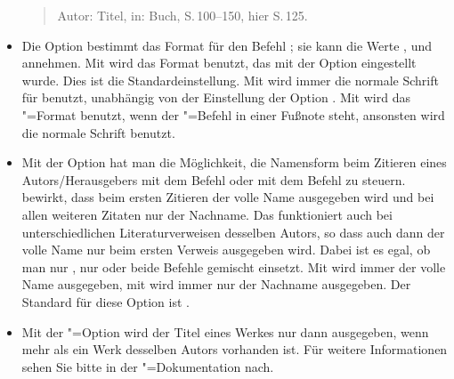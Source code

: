 \documentclass[ngerman]{scrartcl}
\begin{document}
\begin{itemize}
\begin{quote}
				Autor: Titel, in: Buch, S.\,100--150, hier S.\,125.
				\end{quote}
	\item Die Option  bestimmt das Format für den 
	      Befehl ; sie kann die Werte ,  und 
	       annehmen. Mit  wird das Format
	      benutzt, das mit der Option  eingestellt wurde. Dies ist die 
	      Standardeinstellung. Mit  wird immer die normale 
	      Schrift für  benutzt, unabhängig von der Einstellung der Option 
	      . Mit  wird das 
	      "=Format benutzt, wenn der "=Befehl in einer 
	      Fußnote steht, ansonsten wird die normale Schrift benutzt.
  \item Mit
	      der Option  hat man die Möglichkeit, die Namensform
	      beim Zitieren eines Autors\slash Herausgebers mit dem Befehl 
        oder mit dem Befehl  zu steuern. 
        bewirkt, dass beim ersten Zitieren der volle Name ausgegeben wird und bei allen 
        weiteren Zitaten nur der Nachname. Das funktioniert auch bei unterschiedlichen
        Literaturverweisen desselben Autors, so dass auch dann der volle Name nur beim 
        ersten Verweis ausgegeben wird. Dabei ist es egal, ob man nur , 
        nur  oder beide Befehle gemischt einsetzt. Mit 
         wird immer der volle Name ausgegeben, mit 
         wird immer nur der Nachname ausgegeben. 
        Der Standard für diese Option ist .
	\item Mit
	      der \bl"=Option  wird der Titel eines Werkes
	      nur dann ausgegeben, wenn mehr als ein Werk desselben Autors vorhanden ist.
				Für weitere Informationen sehen Sie bitte in der \bl"=Dokumentation nach.
\end{itemize}
\end{document}

